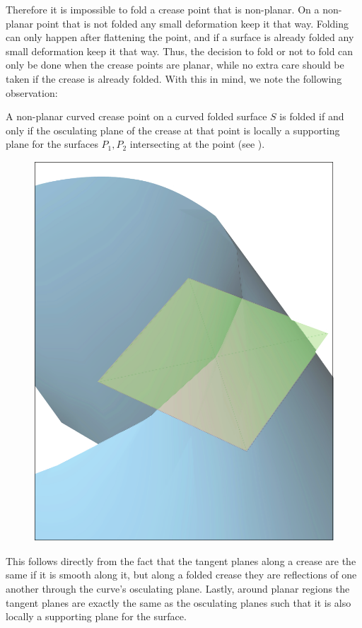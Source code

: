 Therefore it is impossible to fold a crease point that is non-planar. On a non-planar point that is not folded any small deformation keep it that way. Folding can only happen after flattening the point, and if a surface is already folded any small deformation keep it that way. Thus, the decision to fold or not to fold can only be done when the crease points are planar, while no extra care should be taken if the crease is already folded. With this in mind, we note the following observation:

\begin{theorem}\label{Thm:supporting_plane}
A non-planar curved crease point on a curved folded surface $S$ is folded if and only if the osculating plane of the crease at that point is locally a supporting plane for the surfaces $P_1,P_2$ intersecting at the point (see ).
\end{theorem}

\begin{figure} [h]
	\centering
	\includegraphics[width=0.5\linewidth]{figures/plane_side}
	\caption{}
	\label{fig:plane_side}
\end{figure}

This follows directly from the fact that the tangent planes along a crease are the same if it is smooth along it, but along a folded crease they are reflections of one another through the curve's osculating plane. Lastly, around planar regions the tangent planes are exactly the same as the osculating planes such that it is also locally a supporting plane for the surface.

